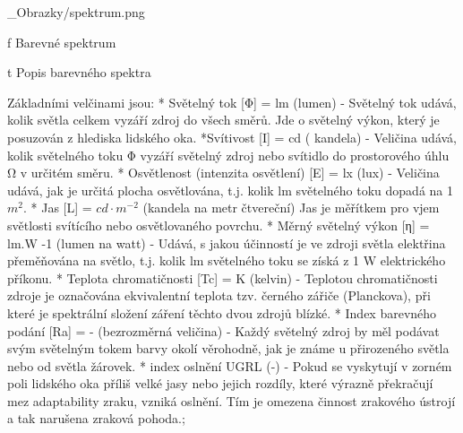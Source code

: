 \medskip {}
\picw=10cm _Obrazky/spektrum.png
\caption/f Barevné spektrum
\medskip

\midinsert {}
\caption/t Popis barevného spektra
\endinsert




\medskip
Základními velčinami jsou:
\begitems
* {\sbf Světelný tok [Φ] = lm (lumen)} - Světelný tok udává, kolik světla celkem vyzáří zdroj do všech směrů. Jde o světelný výkon, který je posuzován z hlediska lidského oka.
*{\sbf Svítivost [I] = cd ( kandela)} - Veličina udává, kolik světelného toku Φ vyzáří světelný zdroj nebo svítidlo do prostorového úhlu Ω v určitém směru.
* {\sbf Osvětlenost (intenzita osvětlení) [E] = lx (lux)} - Veličina udává, jak je určitá plocha osvětlována, t.j. kolik lm světelného toku dopadá na 1 $m^2$.
* {\sbf Jas [L] = $cd \cdot m^{-2}$ (kandela na metr čtvereční)}
Jas je měřítkem pro vjem světlosti svítícího nebo osvětlovaného povrchu.
* {\sbf Měrný světelný výkon [η] = lm.W -1 (lumen na watt)} - 
Udává, s jakou účinností je ve zdroji světla elektřina přeměňována na světlo, t.j. kolik lm světelného toku se získá z 1 W elektrického příkonu.
* {\sbf Teplota chromatičnosti [Tc] = K (kelvin)} - Teplotou chromatičnosti zdroje je označována ekvivalentní teplota tzv. černého zářiče
(Planckova), při které je spektrální složení záření těchto dvou zdrojů blízké. 
* {\sbf Index barevného podání [Ra] = - (bezrozměrná veličina)} - 
Každý světelný zdroj by měl podávat svým světelným tokem barvy okolí věrohodně, jak je známe u přirozeného světla nebo od světla žárovek.
* {\sbf index oslnění UGRL (-)} - Pokud se vyskytují v zorném poli lidského oka příliš velké jasy nebo jejich rozdíly, které výrazně překračují mez adaptability zraku, vzniká oslnění. Tím je omezena činnost zrakového ústrojí a tak narušena zraková pohoda.;
\enditems




